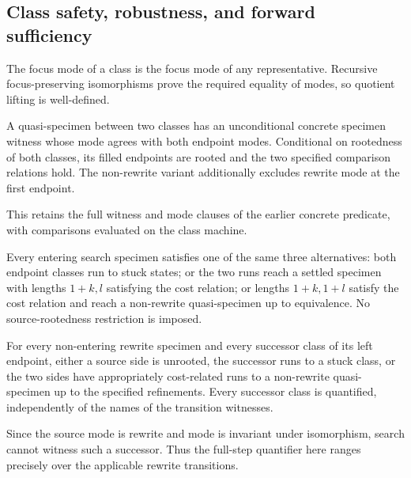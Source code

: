 

\subsection{Class safety, robustness, and forward sufficiency}
\begin{definition}
The focus mode of a class is the focus mode of any representative. Recursive
focus-preserving isomorphisms prove the required equality of modes, so quotient
lifting is well-defined.
\end{definition}


\begin{definition}
A quasi-specimen between two classes has an unconditional concrete specimen
witness whose mode agrees with both endpoint modes. Conditional on rootedness
of both classes, its filled endpoints are rooted and the two specified
comparison relations hold. The non-rewrite variant additionally excludes
rewrite mode at the first endpoint.
\end{definition}
This retains the full witness and mode clauses of the earlier concrete
predicate, with comparisons evaluated on the class machine.



\begin{definition}
Every entering search specimen satisfies one of the same three alternatives:
both endpoint classes run to stuck states; or the two runs reach a settled
specimen with lengths $1+k,l$ satisfying the cost relation; or lengths
$1+k,1+l$ satisfy the cost relation and reach a non-rewrite quasi-specimen
up to equivalence. No source-rootedness restriction is imposed.
\end{definition}


\begin{definition}
For every non-entering rewrite specimen and every successor class of its left
endpoint, either a source side is unrooted, the successor runs to a stuck
class, or the two sides have appropriately cost-related runs to a non-rewrite
quasi-specimen up to the specified refinements. Every successor class is
quantified, independently of the names of the transition witnesses.
\end{definition}
Since the source mode is rewrite and mode is invariant under isomorphism,
search cannot witness such a successor. Thus the full-step quantifier here
ranges precisely over the applicable rewrite transitions.

